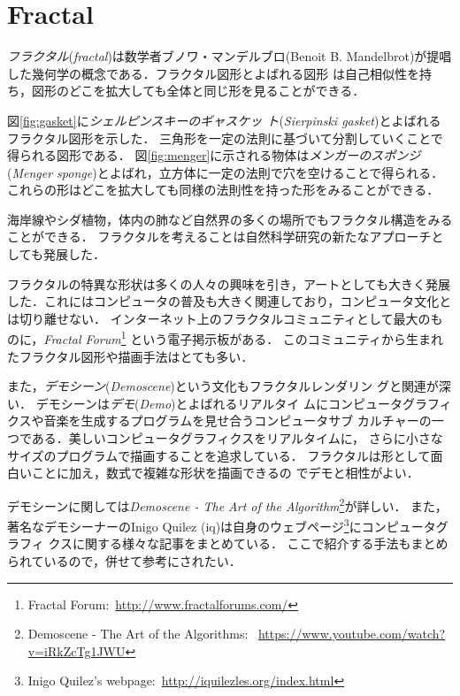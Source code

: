 
\section{Fractal}

\emph{フラクタル}(\textit{fractal})は数学者ブノワ・マンデルブロ(Benoit
B. Mandelbrot)が提唱した幾何学の概念である．フラクタル図形とよばれる図形
は自己相似性を持ち，図形のどこを拡大しても全体と同じ形を見ることができる．

図\ref{fig:gasket}に\emph{シェルピンスキーのギャスケッ
ト}(\textit{Sierpinski gasket})とよばれるフラクタル図形を示した．
三角形を一定の法則に基づいて分割していくことで得られる図形である．
図\ref{fig:menger}に示される物体は\emph{メンガーのスポンジ}(\textit{Menger
sponge})とよばれ，立方体に一定の法則で穴を空けることで得られる．
これらの形はどこを拡大しても同様の法則性を持った形をみることができる．

海岸線やシダ植物，体内の肺など自然界の多くの場所でもフラクタル構造をみる
ことができる．
フラクタルを考えることは自然科学研究の新たなアプローチとしても発展した．

フラクタルの特異な形状は多くの人々の興味を引き，アートとしても大きく発展
した．これにはコンピュータの普及も大きく関連しており，コンピュータ文化と
は切り離せない．
インターネット上のフラクタルコミュニティとして最大のものに，\textit{Fractal
Forum}\footnote{Fractal Forum:~\url{http://www.fractalforums.com/}}
という電子掲示板がある．
このコミュニティから生まれたフラクタル図形や描画手法はとても多い．

また，\emph{デモシーン}(\textit{Demoscene})という文化もフラクタルレンダリン
グと関連が深い．
デモシーンは\emph{デモ}(\textit{Demo})とよばれるリアルタイ
ムにコンピュータグラフィクスや音楽を生成するプログラムを見せ合うコンピュータサブ
カルチャーの一つである．美しいコンピュータグラフィクスをリアルタイムに，
さらに小さなサイズのプログラムで描画することを追求している．
フラクタルは形として面白いことに加え，数式で複雑な形状を描画できるの
でデモと相性がよい．

デモシーンに関しては\textit{Demoscene - The
Art of the Algorithm}\footnote{Demoscene - The Art of the Algorithms:
~\url{https://www.youtube.com/watch?v=iRkZcTg1JWU}}が詳しい．
また，著名なデモシーナーのInigo Quilez (iq)は自身のウェブページ\footnote{Inigo
Quilez's webpage:~\url{http://iquilezles.org/index.html}}にコンピュータグラフィ
クスに関する様々な記事をまとめている．
ここで紹介する手法もまとめられているので，併せて参考にされたい．


